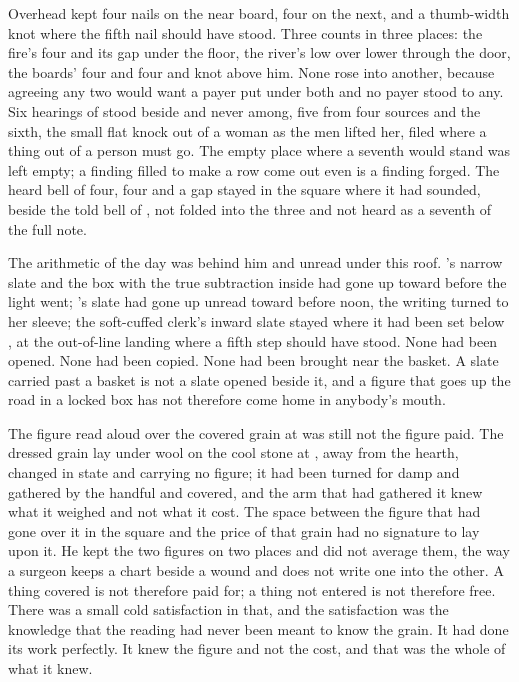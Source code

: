 Overhead  kept four nails on the near board, four on the next, and a thumb-width knot where the fifth nail should have stood. Three counts in three places: the fire's four and its gap under the floor, the river's low over lower through the door, the boards' four and four and knot above him. None rose into another, because agreeing any two would want a payer put under both and no payer stood to any. Six hearings of  stood beside and never among, five from four sources and the sixth, the small flat knock out of a woman as the men lifted her, filed where a thing out of a person must go. The empty place where a seventh would stand was left empty; a finding filled to make a row come out even is a finding forged. The heard bell of four, four and a gap stayed in the square where it had sounded, beside the told bell of , not folded into the three and not heard as a seventh of the full note.

The arithmetic of the day was behind him and unread under this roof. 's narrow slate and the box with the true subtraction inside had gone up  toward  before the light went; 's slate had gone up unread toward  before noon, the writing turned to her sleeve; the soft-cuffed clerk's inward slate stayed where it had been set below , at the out-of-line landing where a fifth step should have stood. None had been opened. None had been copied. None had been brought near the basket. A slate carried past a basket is not a slate opened beside it, and a figure that goes up the road in a locked box has not therefore come home in anybody's mouth.

The figure read aloud over the covered grain at  was still not the figure paid. The dressed grain lay under wool on the cool stone at , away from the hearth, changed in state and carrying no figure; it had been turned for damp and gathered by the handful and covered, and the arm that had gathered it knew what it weighed and not what it cost. The space between the figure that had gone over it in the square and the price of that grain had no signature to lay upon it. He kept the two figures on two places and did not average them, the way a surgeon keeps a chart beside a wound and does not write one into the other. A thing covered is not therefore paid for; a thing not entered is not therefore free. There was a small cold satisfaction in that, and the satisfaction was the knowledge that the reading had never been meant to know the grain. It had done its work perfectly. It knew the figure and not the cost, and that was the whole of what it knew.

